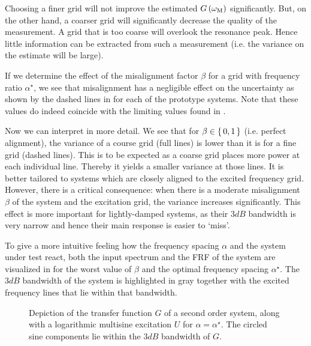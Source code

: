   Choosing a finer grid will not improve the estimated $G\left( \omega_{\mathrm{M}} \right)$ significantly.
  But, on the other hand, a coarser grid will significantly decrease the quality of the measurement.
  A grid that is too coarse will overlook the resonance peak.
  Hence little information can be extracted from such a measurement (i.e. the variance on the estimate will be large).

  If we determine the effect of the misalignment factor $\beta$ for a grid with frequency ratio $\alpha^{\star}$, we see that misalignment has a negligible effect on the uncertainty as shown by the dashed lines in  for each of the prototype systems.
  Note that these values do indeed coincide with the limiting values found in .
  
  Now we can interpret  in more detail.
  We see that for $\beta \in \set{0,1}$ (i.e. perfect alignment), the variance of a course grid (full lines) is lower than it is for a fine grid (dashed lines).
  This is to be expected as a coarse grid places more power at each individual line.
  Thereby it yields a smaller variance at those lines.
  It is better tailored to systems which are closely aligned to the excited frequency grid.
  However, there is a critical consequence: when there is a moderate misalignment $\beta$ of the system and the excitation grid, the variance increases significantly.
  This effect is more important for lightly-damped systems, as their $3\unit{dB}$ bandwidth is very narrow and hence their main response is easier to `miss'.

  To give a more intuitive feeling how the frequency spacing $\alpha$ and the system under test react, both the input spectrum and the FRF of the system are visualized in  for the worst value of $\beta$ and the optimal frequency spacing $\alpha^{\star}$.
  The $3\unit{dB}$ bandwidth of the system is highlighted in gray together with the excited frequency lines that lie within that bandwidth.

  \begin{figure}%
    \centering
      \setlength{}
      \setlength\figureheight{0.68\figurewidth}
    
    \caption[System with highlighted bandwidth and multisine components.]{Depiction of the transfer function $G$ of a second order system, along with a logarithmic multisine excitation $U$ for $\alpha = \alpha^{\star}$. The circled sine components lie within the $3 \unit{dB}$ bandwidth of $G$.}%
    \label{fig:signalAndSystem}
  \end{figure}

